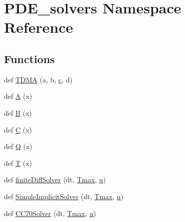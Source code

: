 \hypertarget{namespacePDE__solvers}{}\section{P\+D\+E\+\_\+solvers Namespace Reference}
\label{namespacePDE__solvers}
\subsection*{Functions}
\begin{DoxyCompactItemize}
\item 
def \hyperlink{namespacePDE__solvers_a7e8f1dede17ef38bf75b8db7cee5bf38}{T\+D\+MA} (a, b, \hyperlink{namespacePDE__solvers_a730023a0d9af5165d835a6dcc10e67d2}{c}, d)
\item 
def \hyperlink{namespacePDE__solvers_a01e04051a07f5e380f02fa1a2a000531}{A} (x)
\item 
def \hyperlink{namespacePDE__solvers_a209625175ace8add9160ffa5438c150a}{B} (x)
\item 
def \hyperlink{namespacePDE__solvers_a2f40c0a059e412453818e6482fb92b09}{C} (x)
\item 
def \hyperlink{namespacePDE__solvers_a4e422ca6c34b0d9d943190ee570abb08}{Q} (x)
\item 
def \hyperlink{namespacePDE__solvers_a6728696b430071890e97671c2c6069fa}{T} (x)
\item 
def \hyperlink{namespacePDE__solvers_a306ac1abd1ee9ac53a496bbb64eac157}{finite\+Diff\+Solver} (dt, \hyperlink{namespacePDE__solvers_acdfd09d09c00385a3f3574d55d7e54a9}{Tmax}, \hyperlink{namespacePDE__solvers_abaa9fdf113a88661fc0afa93032755d3}{u})
\item 
def \hyperlink{namespacePDE__solvers_a093eb37c7beab9cbd84f388e77821fce}{Simple\+Implicit\+Solver} (dt, \hyperlink{namespacePDE__solvers_acdfd09d09c00385a3f3574d55d7e54a9}{Tmax}, \hyperlink{namespacePDE__solvers_abaa9fdf113a88661fc0afa93032755d3}{u})
\item 
def \hyperlink{namespacePDE__solvers_aeb1cc15f3da8633c104496a7cb7aa83c}{C\+C70\+Solver} (dt, \hyperlink{namespacePDE__solvers_acdfd09d09c00385a3f3574d55d7e54a9}{Tmax}, \hyperlink{namespacePDE__solvers_abaa9fdf113a88661fc0afa93032755d3}{u})
\end{DoxyCompactItemize}
